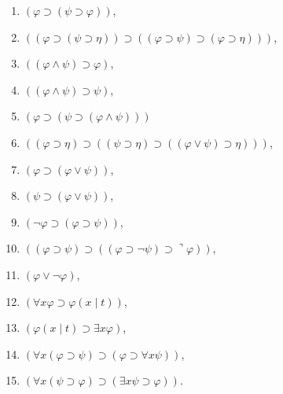 \documentclass[10pt]{article}
\begin{document}
\begin{enumerate}

  \item $(\varphi \supset(\psi \supset \varphi))$,



  \item $((\varphi \supset(\psi \supset \eta)) \supset((\varphi \supset \psi) \supset(\varphi \supset \eta)))$,



  \item $((\varphi \wedge \psi) \supset \varphi)$,



  \item $((\varphi \wedge \psi) \supset \psi)$,



  \item $(\varphi \supset(\psi \supset(\varphi \wedge \psi)))$



  \item $((\varphi \supset \eta) \supset((\psi \supset \eta) \supset((\varphi \vee \psi) \supset \eta)))$,



  \item $(\varphi \supset(\varphi \vee \psi))$,



  \item $(\psi \supset(\varphi \vee \psi))$,



  \item $(\neg \varphi \supset(\varphi \supset \psi))$,



  \item $((\varphi \supset \psi) \supset((\varphi \supset \neg \psi) \supset\urcorner \varphi))$,



  \item $(\varphi \vee \neg \varphi)$,



  \item $(\forall x \varphi \supset \varphi(x \mid t))$,



  \item $(\varphi(x \mid t) \supset \exists x \varphi)$,



  \item $(\forall x(\varphi \supset \psi) \supset(\varphi \supset \forall x \psi))$,



  \item $(\forall x(\psi \supset \varphi) \supset(\exists x \psi \supset \varphi))$.



\end{enumerate}
\end{document}
